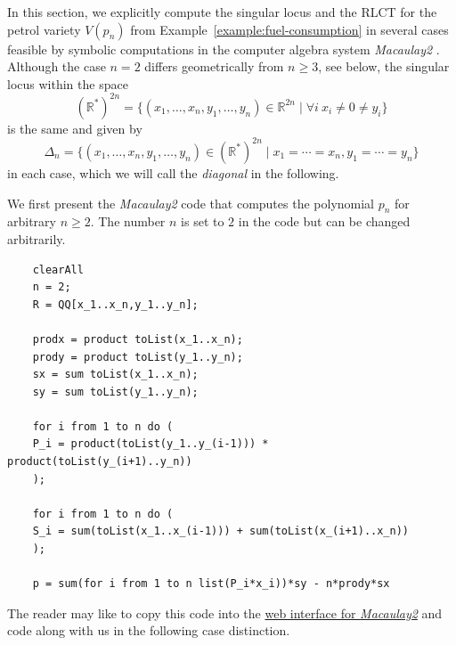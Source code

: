 \documentclass[11pt]{amsart}
\numberwithin{equation}{section}
\theoremstyle{plain}
\theoremstyle{definition}
\newcommand{\R}{\mathbb{R}}
\begin{document}
In this section, we explicitly compute the singular locus and the RLCT for the petrol variety $V(p_n)$ from Example~\ref{example:fuel-consumption} in several cases feasible by symbolic computations in the computer algebra system \emph{Macaulay2} \cite{M2}. Although the case $n = 2$ differs geometrically from $n\geq 3$, see below, the singular locus within the space \[(\R^*)^{2n} = \{(x_1,\ldots,x_n,y_1,\ldots,y_n) \in \R^{2n} \mid \forall i \ x_i \neq 0 \neq y_i\}\] is the same and given by 
\[
\Delta_n = \{(x_1,\ldots,x_n,y_1,\ldots,y_n) \in (\R^*)^{2n} \mid  x_1 = \cdots = x_n, y_1 = \cdots = y_n\}
\]
in each case, which we will call the \emph{diagonal} in the following.

We first present the \emph{Macaulay2} code that computes the polynomial $p_n$ for arbitrary $n \geq 2$. The number $n$ is set to $2$ in the code but can be changed arbitrarily.
\begin{verbatim}
    clearAll
    n = 2;
    R = QQ[x_1..x_n,y_1..y_n];

    prodx = product toList(x_1..x_n);
    prody = product toList(y_1..y_n);
    sx = sum toList(x_1..x_n);
    sy = sum toList(y_1..y_n);

    for i from 1 to n do (
    P_i = product(toList(y_1..y_(i-1))) * product(toList(y_(i+1)..y_n))
    );

    for i from 1 to n do (
    S_i = sum(toList(x_1..x_(i-1))) + sum(toList(x_(i+1)..x_n))
    );

    p = sum(for i from 1 to n list(P_i*x_i))*sy - n*prody*sx
\end{verbatim}
The reader may like to copy this code into the \href{https://www.unimelb-macaulay2.cloud.edu.au/#home}{web interface for \emph{Macaulay2}} and code along with us in the following case distinction.
\end{document}
